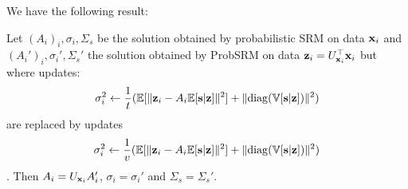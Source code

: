 \documentclass{article}
\begin{document}
We have the following result:
\begin{proposition}
  Let $(A_i)_i, \sigma_i, \Sigma_s$ be the solution obtained by probabilistic SRM on data
  $\mathbf{x}_i$ and $(A_i')_i, \sigma_i', \Sigma_s'$ the solution obtained by ProbSRM on
  data $\mathbf{z}_i = U_{\mathbf{x}_i}^{\top} \mathbf{x}_i$ but where updates:
  \begin{align}
    \sigma_i^2 \leftarrow \frac1{t} (\mathbb{E}[\| \mathbf{z}_i - A_i \mathbb{E}[\mathbf{s}|\mathbf{z}]\|^2] + \| {\rm diag}(\mathbb{V}[\mathbf{s} | \mathbf{z}]) \|^2)
  \end{align}
  are replaced by updates
  \begin{align}
    \sigma_i^2 \leftarrow \frac1{v} (\mathbb{E}[\| \mathbf{z}_i - A_i \mathbb{E}[\mathbf{s}|\mathbf{z}]\|^2] + \| {\rm diag}(\mathbb{V}[\mathbf{s} | \mathbf{z}]) \|^2)
  \end{align}
  .
  Then $A_i = U_{\mathbf{x}_i}A_i'$, $\sigma_i =
  \sigma_i'$ and $\Sigma_s = \Sigma_s'$.
  
  \label{prop:optimalprobsrm}
\end{proposition}
\end{document}
